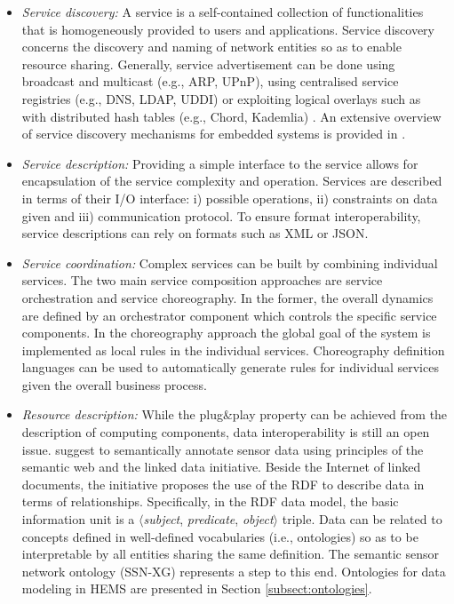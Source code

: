 \documentclass{article}
\begin{document}
\begin{itemize}
\item \textit{Service discovery:}
A service is a self-contained collection of functionalities that is homogeneously provided to users and applications.
Service discovery concerns the discovery and naming of network entities so as to enable resource sharing.
Generally, service advertisement can be done using broadcast and multicast (e.g., ARP, UPnP), using centralised service registries (e.g., DNS, LDAP, UDDI) or exploiting logical overlays such as with distributed hash tables (e.g., Chord, Kademlia) \cite{Dargie}.
An extensive overview of service discovery mechanisms for embedded systems is provided in \cite{m2membedded}.
\item \textit{Service description:}
Providing a simple interface to the service allows for encapsulation of the service complexity and operation.
Services are described in terms of their I/O interface: i) possible operations, ii) constraints on data given and iii) communication protocol.
To ensure format interoperability, service descriptions can rely on formats such as XML or JSON.


\item \textit{Service coordination:}
Complex services can be built by combining individual services.
The two main service composition approaches are service orchestration and service choreography.
In the former, the overall dynamics are defined by an orchestrator component which controls the specific service components.
In the choreography approach the global goal of the system is implemented as local rules in the individual services.
Choreography definition languages can be used to automatically generate rules for individual services given the overall business process.


\item \textit{Resource description:}
While the plug\&play property \cite{pitzek:05} can be achieved from the description of computing components, data interoperability is still an open issue.
\cite{Heath2011,6069708,monacchi:2013} suggest to semantically annotate sensor data using principles of the semantic web and the linked data initiative.
Beside the Internet of linked documents, the initiative proposes the use of the \ac{RDF} to describe data in terms of relationships.
Specifically, in the RDF data model, the basic information unit is a $\langle$\textit{subject}, \textit{predicate}, \textit{object}$\rangle$ triple.
Data can be related to concepts defined in well-defined vocabularies (i.e., ontologies) so as to be interpretable by all entities sharing the same definition.
The semantic sensor network ontology (SSN-XG) represents a step to this end. Ontologies for data modeling in \ac{HEMS} are presented in Section \ref{subsect:ontologies}.
\end{itemize}
\end{document}
